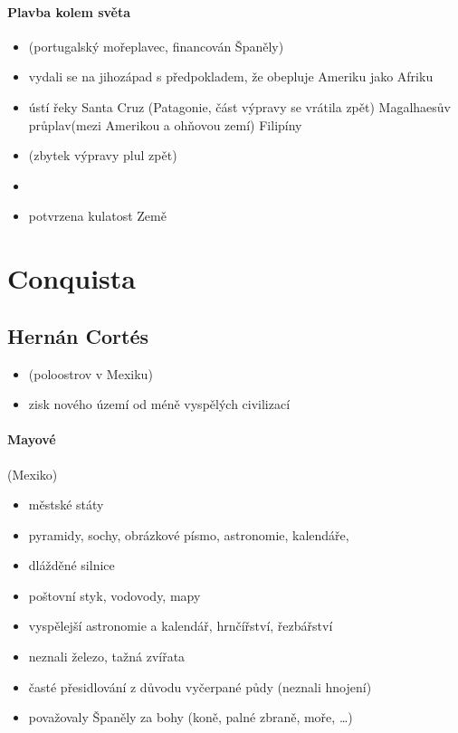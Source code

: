 \paragraph{Plavba kolem světa}
\begin{itemize}
\item {} (portugalský mořeplavec, financován Španěly)
\item vydali se na jihozápad s předpokladem, že obepluje Ameriku jako Afriku
\item ústí řeky Santa Cruz (Patagonie, část výpravy se vrátila zpět) \ra Magalhaesův průplav(mezi Amerikou a ohňovou zemí) \ra Filipíny
\item {} (zbytek výpravy plul zpět)
\item {}
\item[\ra] potvrzena kulatost Země
\end{itemize}



\section{Conquista}
\subsection{Hernán Cortés}
\begin{itemize}
\item {} (poloostrov v Mexiku)
\item zisk nového území od méně vyspělých civilizací
\end{itemize}
\paragraph{Mayové} (Mexiko)
	\begin{itemize}
	\item městské státy
	\item pyramidy, sochy, obrázkové písmo, astronomie, kalendáře, 
	\item dlážděné silnice \item poštovní styk, vodovody, mapy
	\item vyspělejší astronomie a kalendář, hrnčířství, řezbářství
	\item neznali železo, tažná zvířata
	\item časté přesidlování z důvodu vyčerpané půdy (neznali hnojení)
	\item považovaly Španěly za bohy (koně, palné zbraně, moře, \ldots)
	\end{itemize}

